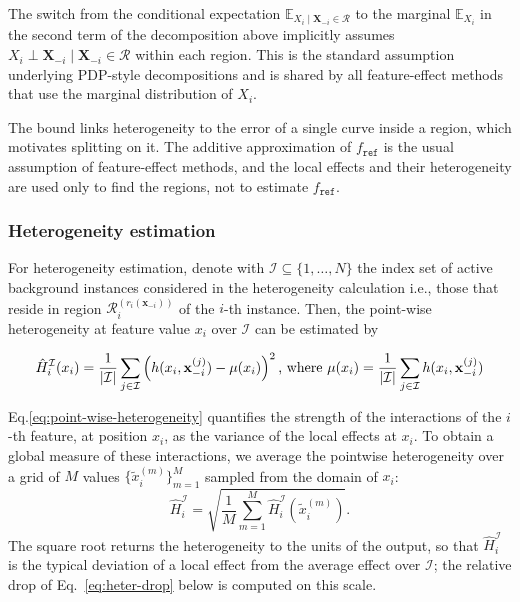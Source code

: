 \begin{remark}\label{rem:independence}
The switch from the conditional expectation $\mathbb{E}_{X_i \mid \mathbf{X}_{-i} \in \mathcal{R}}$ to the marginal $\mathbb{E}_{X_i}$ in the second term of the decomposition above implicitly assumes $X_i \perp \mathbf{X}_{-i} \mid \mathbf{X}_{-i} \in \mathcal{R}$ within each region. This is the standard assumption underlying PDP-style decompositions and is shared by all feature-effect methods that use the marginal distribution of $X_i$.
\end{remark}

The bound links heterogeneity to the error of a single curve inside a region, which motivates splitting on it. The additive approximation of $f_{\texttt{ref}}$ is the usual assumption of feature-effect methods, and the local effects and their heterogeneity are used only to find the regions, not to estimate $f_{\texttt{ref}}$.

\subsubsection{Heterogeneity estimation}

For heterogeneity estimation, denote with $\mathcal{I} \subseteq \{1, \ldots, N\} $ the index set of active background instances considered in the heterogeneity calculation i.e., those that reside in region $\mathcal{R}^{(r_i(\mathbf{x}_{-i}))}_i$ of the $i$-th instance.
Then, the point-wise heterogeneity at feature value $x_i$ over $\mathcal{I}$ can be estimated by

\begin{equation}\label{eq:point-wise-heterogeneity}
\hat{H}_i^{\mathcal{I}}(x_i) = \frac{1}{|\mathcal{I}|}\sum_{j \in \mathcal{I}} \left ( h(x_i , \mathbf{x}_{-i}^{(j)}) - \mu(x_i) \right )^2 \text{, where } \mu(x_i)=\frac{1}{|\mathcal{I}|} \sum_{j \in \mathcal{I}} h(x_i , \mathbf{x}_{-i}^{(j)})
\end{equation}

Eq.\eqref{eq:point-wise-heterogeneity} quantifies the strength of the interactions of the $i$-th feature, at position $x_i$, as 
the variance of the local effects at $x_i$.
To obtain a global measure of these interactions, we average the pointwise heterogeneity over a grid of $M$ values $\{ {\tilde{x}_i^{(m)}} \}_{m=1}^M$ sampled from the domain of $x_i$:
\begin{equation}
\label{eq:heter-definition}
\hat{H}_i^{\mathcal{I}} = \sqrt{\frac{1}{M} \sum_{m=1}^M \hat{H}_i^{\mathcal{I}}(\tilde{x}_i^{(m)})}.
\end{equation}
The square root returns the heterogeneity to the units of the output, so that $\hat{H}_i^{\mathcal{I}}$ is the typical deviation of a local effect from the average effect over $\mathcal{I}$; the relative drop of Eq.~\eqref{eq:heter-drop} below is computed on this scale.


